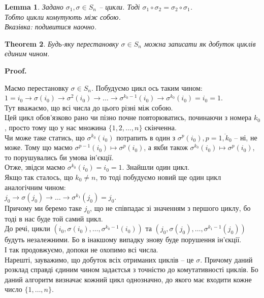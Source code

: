 \documentclass[a4paper, 10pt]{article}
\makeatletter
\theoremstyle{theoremdd}
\newtheorem{theorem}{Theorem}[subsection]
\theoremstyle{theoremdd}
\theoremstyle{theoremdd}
\theoremstyle{theoremdd}
\theoremstyle{theoremdd}
\theoremstyle{theoremdd}
\theoremstyle{theoremdd}
\theoremstyle{theoremdd}
\theoremstyle{theoremdd}
\theoremstyle{theoremdd}
\theoremstyle{theoremdd}
\theoremstyle{theoremdd}
\theoremstyle{theoremdd}
\newtheorem{lemma}[theorem]{Lemma}
\theoremstyle{theoremdd}
\theoremstyle{theoremdd}
\renewenvironment{proof}[1][Proof.\\]{\par
\pushQED{\hfill \qed}%
\normalfont \topsep6\p@\@plus6\p@\relax
\trivlist
\item\relax
{\bfseries
#1\@addpunct{.}}\hspace\labelsep\ignorespaces
}{%
\popQED\endtrivlist\@endpefalse
}
\makeatother
\begin{document}
\begin{lemma}
Задано $\sigma_1, \sigma \in S_n$ -- цикли. Тоді $\sigma_1 \circ \sigma_2 = \sigma_2 \circ \sigma_1$.\\
Тобто цикли комутують між собою.\\
\textit{Вказівка: подивитися наочно.}
\end{lemma}

\begin{theorem}
Будь-яку перестановку $\sigma \in S_n$ можна записати як добуток циклів єдиним чином.
\end{theorem}

\begin{proof}
Маємо перестановку $\sigma \in S_n$. Побудуємо цикл ось таким чином:\\
$1 = i_0 \to \sigma(i_0) \to \sigma^2(i_0) \to \dots \to \sigma^{k_0-1}(i_0) \to \sigma^{k_0}(i_0) = i_0 = 1$.\\
Тут вважаємо, що всі числа до цього різні між собою.\\
Цей цикл обов'язково рано чи пізно почне повторюватись, починаючи з номера $k_0$, просто тому що у нас множина $\{1,2,\dots,n\}$ скінченна.\\
Чи може таке статись, що $\sigma^{k_0}(i_0)$ потрапить в один з $\sigma^{p}(i_0), p = \overline{1,k_0}$ -- ні, не може. Тому що маємо $\sigma^{p-1}(i_0) \mapsto \sigma^p(i_0)$, а якби також $\sigma^{k_0}(i_0) \mapsto \sigma^p(i_0)$, то порушувались би умова ін'єкції.\\
Отже, звідси маємо $\sigma^{k_0}(i_0) = i_0 = 1$. Знайшли один цикл.\\
Якщо так сталось, що $k_0 \neq n$, то тоді побудуємо новий ще один цикл аналогічним чином:\\
$j_0 \to \sigma(j_0) \to \dots \to \sigma^{k_1}(j_0) = j_0$.\\
Причому ми беремо таке $j_0$, що не співпадає зі значенням з першого циклу, бо тоді в нас буде той самий цикл.\\
До речі, цикли $(i_0,\sigma(i_0), \dots, \sigma^{k_0-1}(i_0))$ та $(j_0,\sigma(j_0), \dots, \sigma^{k_1-1}(j_0))$ будуть незалежними. Бо в інакшому випадку знову буде порушення ін'єкції.\\
І так продовжуємо, допоки не охопимо всі числа.\\
Нарешті, зауважимо, що добуток всіх отриманих циклів -- це $\sigma$. Причому даний розклад справді єдиним чином задаєтсья з точністю до комутативності циклів. Бо даний алгоритм визначає кожний цикл однозначно, до якого має входити кожне число $\{1,\dots,n\}$.
\end{proof}
\end{document}
